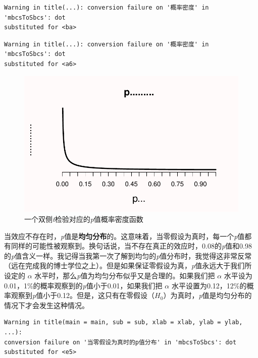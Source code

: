 \documentclass[
  letterpaper,
  DIV=11,
  numbers=noendperiod]{scrreprt}
\begin{document}
\begin{verbatim}
Warning in title(...): conversion failure on '概率密度' in 'mbcsToSbcs': dot
substituted for <ba>
\end{verbatim}

\begin{verbatim}
Warning in title(...): conversion failure on '概率密度' in 'mbcsToSbcs': dot
substituted for <a6>
\end{verbatim}

\begin{figure}

{\centering \includegraphics[width=1\textwidth,height=\textheight]{01-pvalue_files/figure-pdf/fig-pdft-1.pdf}

}

\caption{\label{fig-pdft}一个双侧\emph{t}检验对应的\emph{p}值概率密度函数}

\end{figure}

当效应不存在时，\emph{p}值是\textbf{均匀分布}的。这意味着，当零假设为真时，每一个\emph{p}值都有同样的可能性被观察到。换句话说，当不存在真正的效应时，0.08的\emph{p}值和0.98的\emph{p}值含义一样。我记得当我第一次了解到均匀的\emph{p}值分布时，我觉得这非常反常（远在完成我的博士学位之上）。但是如果保证零假设为真，\emph{p}值永远大于我们所设定的
\(\alpha\) 水平时，那么\emph{p}值为均匀分布似乎又是合理的。如果我们把
\(\alpha\) 水平设为0.01，1\%的概率观察到的\emph{p}值小于0.01，如果我们把
\(\alpha\)
水平设置为0.12，12\%的概率观察到\emph{p}值小于0.12。但是，这只有在零假设（\(H_0\)）为真时，\emph{p}值是均匀分布的情况下才会发生这种情况。

\begin{verbatim}
Warning in title(main = main, sub = sub, xlab = xlab, ylab = ylab, ...):
conversion failure on '当零假设为真时的p值分布' in 'mbcsToSbcs': dot
substituted for <e5>
\end{verbatim}
\end{document}
